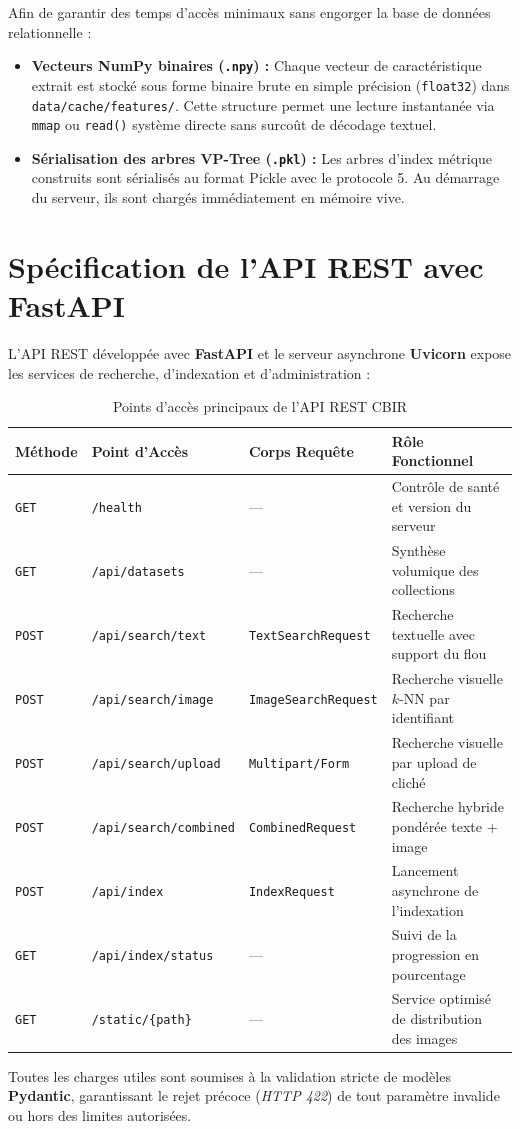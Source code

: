 Afin de garantir des temps d'accès minimaux sans engorger la base de données relationnelle :
\begin{itemize}[nosep]
    \item \textbf{Vecteurs NumPy binaires (\texttt{.npy}) :} Chaque vecteur de caractéristique extrait est stocké sous forme binaire brute en simple précision (\texttt{float32}) dans \texttt{data/cache/features/}. Cette structure permet une lecture instantanée via \texttt{mmap} ou \texttt{read()} système directe sans surcoût de décodage textuel.
    \item \textbf{Sérialisation des arbres VP-Tree (\texttt{.pkl}) :} Les arbres d'index métrique construits sont sérialisés au format Pickle avec le protocole 5. Au démarrage du serveur, ils sont chargés immédiatement en mémoire vive.
\end{itemize}

\section{Spécification de l'API REST avec FastAPI}

L'API REST développée avec \textbf{FastAPI} et le serveur asynchrone \textbf{Uvicorn} expose les services de recherche, d'indexation et d'administration :

\begin{table}[H]
    \centering
    \small
    \caption{Points d'accès principaux de l'API REST CBIR}
    \label{tab:api_endpoints_summary}
    \begin{tabular}{lllp{6.0cm}}
        \toprule
        \textbf{Méthode} & \textbf{Point d'Accès} & \textbf{Corps Requête} & \textbf{Rôle Fonctionnel} \\
        \midrule
        \texttt{GET}  & \texttt{/health} & — & Contrôle de santé et version du serveur \\
        \texttt{GET}  & \texttt{/api/datasets} & — & Synthèse volumique des collections \\
        \texttt{POST} & \texttt{/api/search/text} & \texttt{TextSearchRequest} & Recherche textuelle avec support du flou \\
        \texttt{POST} & \texttt{/api/search/image} & \texttt{ImageSearchRequest} & Recherche visuelle $k$-NN par identifiant \\
        \texttt{POST} & \texttt{/api/search/upload} & \texttt{Multipart/Form} & Recherche visuelle par upload de cliché \\
        \texttt{POST} & \texttt{/api/search/combined} & \texttt{CombinedRequest} & Recherche hybride pondérée texte + image \\
        \texttt{POST} & \texttt{/api/index} & \texttt{IndexRequest} & Lancement asynchrone de l'indexation \\
        \texttt{GET}  & \texttt{/api/index/status} & — & Suivi de la progression en pourcentage \\
        \texttt{GET}  & \texttt{/static/\{path\}} & — & Service optimisé de distribution des images \\
        \bottomrule
    \end{tabular}
\end{table}

Toutes les charges utiles sont soumises à la validation stricte de modèles \textbf{Pydantic}, garantissant le rejet précoce (\textit{HTTP 422}) de tout paramètre invalide ou hors des limites autorisées.
